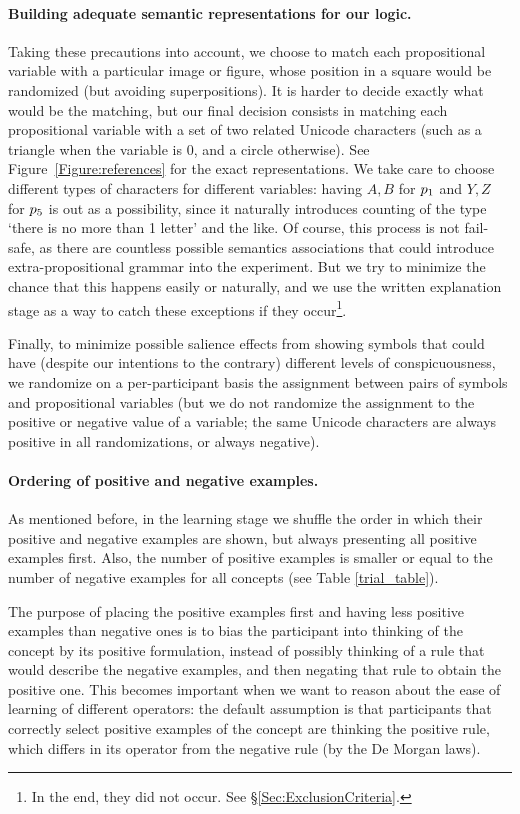 \paragraph{Building adequate semantic representations for our logic.}
Taking these precautions into account, we choose to match each propositional variable with a particular image or figure, whose position in a square would be randomized (but avoiding superpositions). It  is harder to decide exactly what would be the matching, but our final decision consists in matching
each propositional variable with a set of two related Unicode characters (such as a triangle when the variable is $0$, and a circle otherwise). See Figure~\ref{Figure:references} for the exact representations. We take care to choose different types of characters for different variables: having $A,B$ for $p_1$ and $Y,Z$ for $p_5$ is out as a possibility, since it naturally  introduces counting of the type `there is no more than 1 letter' and the like.
Of course, this process is not fail-safe, as there are countless possible semantics associations that could introduce extra-propositional grammar into the experiment. But we try to minimize the chance that this happens easily or naturally, and we use the written explanation stage as a way to catch these exceptions if they occur\footnote{In the end, they did not occur. See \S\ref{Sec:ExclusionCriteria}.}. 

Finally, to minimize possible salience effects from showing symbols that could have (despite our intentions to the contrary) different levels of conspicuousness, we randomize on a per-participant basis the assignment between pairs of symbols and propositional variables (but we do not randomize  the assignment to the positive or negative value of a variable; the same Unicode characters  are  always positive in all randomizations, or always negative).

\paragraph{Ordering of positive and negative examples.}
As mentioned before, in the learning stage we shuffle the order in which their positive and negative examples are shown, but always presenting all positive examples first. Also, the number of positive examples is smaller or equal to the number of negative examples for all concepts (see Table \ref{trial_table}). 

The purpose of placing the positive examples first and having less positive examples than negative ones is to bias the participant into thinking of the concept by its positive formulation, instead of possibly thinking of a rule that would describe the negative examples, and then negating that rule to obtain the positive one. This becomes important when we want to reason about the ease of learning of different operators: the default assumption is that participants that correctly select positive examples of the concept are thinking the positive rule, which differs in its operator from the negative rule (by the De Morgan laws). 





